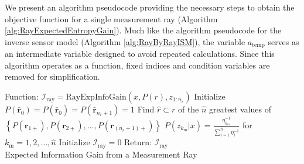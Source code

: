 \documentclass[smallextended]{svjour3}       %
\newcommand{\braces}[1]{\ensuremath{\left\{ #1 \right\}}}
\begin{document}
We present an algorithm pseudocode providing the necessary steps to obtain the objective function for a single measurement ray (Algorithm \ref{alg:RayExpectedEntropyGain}). Much like the algorithm pseudocode for the inverse sensor model (Algorithm \ref{alg:RayByRayISM}), the variable $a_\text{temp}$ serves as an intermediate variable designed to avoid repeated calculations.
Since this algorithm operates as a function, fixed indices and condition variables are removed for simplification. 



\begin{algorithm}[H]
	Function: $\mathcal I_\text{ray}=\text{RayExpInfoGain}(x,P(r),z_{1:n_{r}})$\;
	Initialize $P(\bar{\mathbf{r}}_{0})=P(\hat{\bar{\mathbf{r}}}_{0})=P(\bar{\mathbf{r}}_{n_{r}+1})=1$\;
	Find $\hat r\subset r$ of the $\hat n$ greatest values of 
	$\braces{P(\mathbf{r}_{1+}),P(\mathbf{r}_{2+}),\ldots,P(\mathbf{r}_{(n_{r}+1)+})}$\;
	$P(z_{k_\text{m}}|x)=\frac{\eta^{-1}_{k_\text{m}}}{\sum_{i=1}^{\hat n}\eta^{-1}_{i}}$ for $k_\text{m}=1,2,\ldots,\hat n$\;
	Initialize $\mathcal I_\text{ray}=0$\;
	Return: $\mathcal I_\text{ray}$\\
\caption{Expected Information Gain from a Measurement Ray}
\label{alg:RayExpectedEntropyGain}
\end{algorithm}
\end{document}
